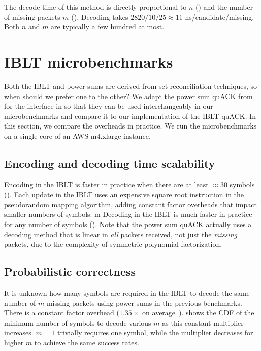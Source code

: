The decode time of this method is directly proportional to $n$ ()
and the number of missing packets $m$ ().
Decoding takes $2820/10/25 \approx 11$ ns/candidate/missing.
Both $n$ and $m$ are typically a few hundred at most.

\section{IBLT microbenchmarks}
\label{sec:quack:iblt-microbenchmarks}

Both the IBLT and power sums are derived from set reconciliation
techniques, so when should we prefer one to the other?
We adapt the power sum quACK from \cite{yuan2024sidekick} for the interface
in 
so that they can be used interchangeably in our microbenchmarks and compare
it to our implementation of the IBLT quACK.
In this section, we compare the overheads in practice.
We run the microbenchmarks on a single core of an AWS m4.xlarge instance.

\subsection{Encoding and decoding time scalability}
\label{sec:quack:iblt-microbenchmarks:scalability}



Encoding in the IBLT is faster in practice when there are at least
$\approx\!30$ symbols ().
Each update in the IBLT uses an expensive square root instruction in the
pseudorandom mapping algorithm, adding constant factor overheads that impact
smaller numbers of symbols.
m
Decoding in the IBLT is much faster in practice for any number of symbols
(). Note that the power sum quACK actually uses a decoding
method that is linear in \textit{all} packets received, not just the \textit
{missing} packets, due to the complexity of symmetric polynomial
factorization.

\subsection{Probabilistic correctness}
\label{sec:quack:iblt-microbenchmarks:correctness}



It is unknown how many symbols are required in the IBLT to decode the same
number of $m$ missing packets using power sums in the previous benchmarks.
There is a constant factor overhead ($1.35\times$ on average~\cite
{yang2024practical}).
 shows the CDF of the minimum number of symbols to decode
various $m$ as this constant multiplier increases. $m=1$ trivially requires
one symbol, while the multiplier decreases for higher $m$ to achieve the same
success rates.


